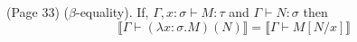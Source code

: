 (Page 33) ($\beta$-equality). If, $\Gamma, x:\sigma \vdash M:\tau$ and $ \Gamma \vdash N:\sigma$ then
$$ \llbracket \Gamma \vdash (\lambda x:\sigma . M)(N) \rrbracket = \llbracket \Gamma \vdash M[N/x] \rrbracket $$